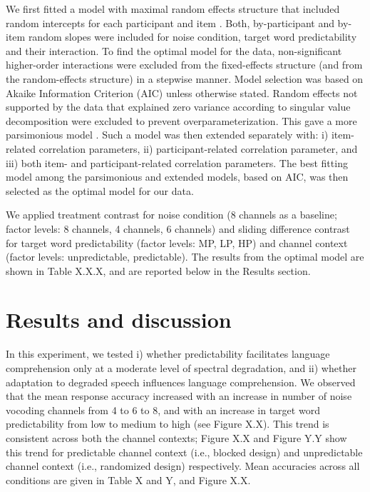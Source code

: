 \documentclass[a4paper, nobind]{templates/ociamthesis}
\begin{document}
We first fitted a model with maximal random effects structure that included random intercepts for each participant and item \autocite{Barr2013}.
Both, by-participant and by-item random slopes were included for noise condition, target word predictability and their interaction.
To find the optimal model for the data, non-significant higher-order interactions were excluded from the fixed-effects structure (and from the random-effects structure) in a stepwise manner.
Model selection was based on Akaike Information Criterion (AIC) \autocite{Grueber2011,Richards2011} unless otherwise stated.
Random effects not supported by the data that explained zero variance according to singular value decomposition were excluded to prevent overparameterization.
This gave a more parsimonious model \autocite{Bates2015a}.
Such a model was then extended separately with: i) item-related correlation parameters, ii) participant-related correlation parameter, and iii) both item- and participant-related correlation parameters.
The best fitting model among the parsimonious and extended models, based on AIC, was then selected as the optimal model for our data.

We applied treatment contrast for noise condition (8 channels as a baseline; factor levels: 8 channels, 4 channels, 6 channels) and sliding difference contrast for target word predictability (factor levels: MP, LP, HP) and channel context (factor levels: unpredictable, predictable).
The results from the optimal model are shown in Table X.X.X, and are reported below in the Results section.

\hypertarget{results-and-discussion-2}{%
\section{Results and discussion}\label{results-and-discussion-2}}

In this experiment, we tested i) whether predictability facilitates language comprehension only at a moderate level of spectral degradation, and ii) whether adaptation to degraded speech influences language comprehension.
We observed that the mean response accuracy increased with an increase in number of noise vocoding channels from 4 to 6 to 8, and with an increase in target word predictability from low to medium to high (see Figure X.X).
This trend is consistent across both the channel contexts; Figure X.X and Figure Y.Y show this trend for predictable channel context (i.e., blocked design) and unpredictable channel context (i.e., randomized design) respectively.
Mean accuracies across all conditions are given in Table X and Y, and Figure X.X.
\end{document}
